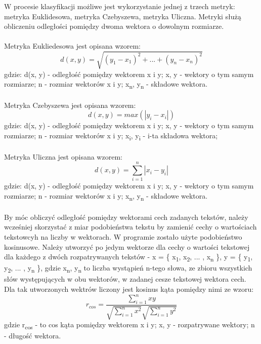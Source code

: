 \documentclass{classrep}
\begin{document}
W procesie klasyfikacji możliwe jest wykorzystanie jednej z trzech metryk: metryka Euklidesowa, metryka Czebyszewa, metryka Uliczna. Metryki służą obliczeniu odległości pomiędzy dwoma wektora o dowolnym rozmiarze.\\\\ Metryka Eukliedesowa\cite{dane} jest opisana wzorem: 
\begin{equation} d(x, y) = \sqrt{(y_1 - x_1)^2 + ... + (y_n - x_n)^2}  \end{equation}
gdzie: d(x, y) - odległość pomiędzy wektorem x i y; x, y - wektory o tym samym rozmiarze; n - rozmiar wektorów x i y;  x\textsubscript{n}, y\textsubscript{n} - składowe wektora. 
\\\\
Metryka Czebyszewa\cite{dane} jest opisana wzorem: 
\begin{equation} d(x, y) = max(|y_i - x_i|) \end{equation}
gdzie: d(x, y) - odległość pomiędzy wektorem x i y; x, y - wektory o tym samym rozmiarze; n - rozmiar wektorów x i y;  x\textsubscript{i}, y\textsubscript{i} - i-ta składowa wektora;
\\\\
Metryka Uliczna\cite{dane} jest opisana wzorem: 
\begin{equation} d(x, y) = \sum_{i = 1}^{n} |x_i - y_i| \end{equation}
gdzie: d(x, y) - odległość pomiędzy wektorem x i y; x, y - wektory o tym samym rozmiarze; n - rozmiar wektorów x i y;  x\textsubscript{n}, y\textsubscript{n} - składowe wektora. 
\\\\
By móc obliczyć odległość pomiędzy wektorami cech zadanych tekstów, należy wcześniej skorzystać z miar podobieństwa tekstu by zamienić cechy o wartościach tekstowcyh na liczby w wektorach. W programie zostało użyte podobieństwo kosinusowe\cite{wyklad}. Należy utworzyć po jedym wektorze dla cechy o wartości tekstowej dla każdego z dwóch rozpatrywanych tekstów - x = \{ x\textsubscript{1}, x\textsubscript{2}, ... , x\textsubscript{n} \},  y = \{ y\textsubscript{1}, y\textsubscript{2}, ... , y\textsubscript{n} \}, gdzie x\textsubscript{n}, y\textsubscript{n}  to liczba wystąpień n-tego słowa, ze zbioru wszystkich słów występujących w obu wektorów, w zadanej cesze tekstowej wektora cech. Dla tak utworzonych wektrów liczony jest kosinus kąta pomiędzy nimi ze wzoru:
\begin{equation} r_{cos} = \frac{\sum_{i = 1}^{n} x y}{\sqrt{\sum_{i = 1}^{n} x^2}\sqrt{\sum_{i = 1}^{n} y^2}} \end{equation}
gdzie r\textsubscript{cos} - to cos kąta pomiędzy wektorem x i y; x, y - rozpatrywane wektory; n - długość wektora.
\ \\ \\ 
\end{document}
